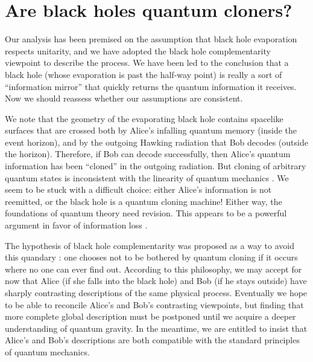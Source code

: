 \documentclass[11pt]{article}
\begin{document}
\section{Are black holes quantum cloners?}
\label{sec:cloning}

Our analysis has been premised on the assumption that black hole evaporation respects unitarity, and we have adopted the black hole complementarity viewpoint to describe the process. We have been led to the conclusion that a black hole (whose evaporation is past the half-way point) is really a sort of ``information mirror'' that quickly returns the quantum information it receives. Now we should reassess whether our assumptions are consistent. 

We note that the geometry of the evaporating black hole contains spacelike surfaces that are crossed  both by Alice's infalling quantum memory (inside the event horizon), and by the outgoing Hawking radiation that Bob decodes (outside the horizon). Therefore, if Bob can decode successfully, then Alice's quantum information has been ``cloned'' in the outgoing radiation. But cloning of arbitrary quantum states is inconsistent with the linearity of quantum mechanics \cite{no-cloning,dieks}. We seem to be stuck with a difficult choice: either Alice's information is not reemitted, or the black hole is a quantum cloning machine! Either way, the foundations of quantum theory need revision. This appears to be a powerful argument in favor of information loss \cite{preskill-destroy}. 

The hypothesis of black hole complementarity was proposed as a way to avoid this quandary \cite{complement,susskind-book}: one chooses not to be bothered by quantum cloning if it occurs where no one can ever find out. According to this philosophy, we may accept for now that Alice (if she falls into the black hole) and Bob (if he stays outside) have sharply contrasting descriptions of the same physical process. Eventually we hope to be able to reconcile Alice's and Bob's contrasting viewpoints, but finding that more complete global description must be postponed until we acquire a deeper understanding of quantum gravity. In the meantime, we are entitled to insist that Alice's and Bob's descriptions are both compatible with the standard principles of quantum mechanics.
\end{document}
